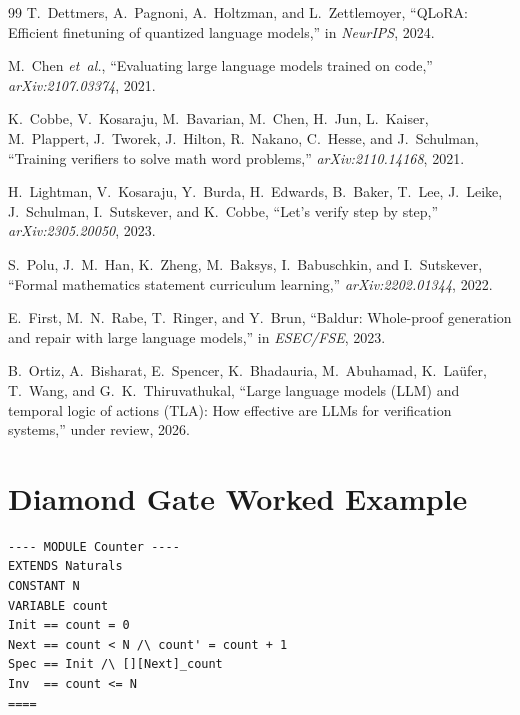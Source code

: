 \documentclass[11pt]{article}
\begin{document}
\begin{thebibliography}{99}
T.~Dettmers, A.~Pagnoni, A.~Holtzman, and L.~Zettlemoyer,
``QLoRA: Efficient finetuning of quantized language models,'' in
\emph{NeurIPS}, 2024.

M.~Chen \emph{et~al.}, ``Evaluating large language models trained on
code,'' \emph{arXiv:2107.03374}, 2021.

K.~Cobbe, V.~Kosaraju, M.~Bavarian, M.~Chen, H.~Jun, L.~Kaiser,
M.~Plappert, J.~Tworek, J.~Hilton, R.~Nakano, C.~Hesse, and J.~Schulman,
``Training verifiers to solve math word problems,''
\emph{arXiv:2110.14168}, 2021.

H.~Lightman, V.~Kosaraju, Y.~Burda, H.~Edwards, B.~Baker, T.~Lee,
J.~Leike, J.~Schulman, I.~Sutskever, and K.~Cobbe,
``Let's verify step by step,'' \emph{arXiv:2305.20050}, 2023.

S.~Polu, J.~M.~Han, K.~Zheng, M.~Baksys, I.~Babuschkin, and
I.~Sutskever, ``Formal mathematics statement curriculum learning,''
\emph{arXiv:2202.01344}, 2022.

E.~First, M.~N.~Rabe, T.~Ringer, and Y.~Brun, ``Baldur: Whole-proof
generation and repair with large language models,'' in
\emph{ESEC/FSE}, 2023.

B.~Ortiz, A.~Bisharat, E.~Spencer, K.~Bhadauria, M.~Abuhamad,
K.~La\"ufer, T.~Wang, and G.~K.~Thiruvathukal,
``Large language models ({LLM}) and temporal logic of actions
({TLA}): How effective are {LLM}s for verification systems,''
under review, 2026.

\end{thebibliography}

\appendix
\newpage

\section{Diamond Gate Worked Example}
\label{app:diamond-example}

\begin{tcolorbox}[
  enhanced, colback=cbox, colframe=cline, boxrule=0.5pt,
  arc=2pt, left=6pt, right=6pt, top=3pt, bottom=3pt,
  title=\textbf{Example: Counter specification (Diamond-pass)},
  fonttitle=\small,
]
\begin{verbatim}
---- MODULE Counter ----
EXTENDS Naturals
CONSTANT N
VARIABLE count
Init == count = 0
Next == count < N /\ count' = count + 1
Spec == Init /\ [][Next]_count
Inv  == count <= N
====
\end{verbatim}
\end{tcolorbox}
\end{document}
